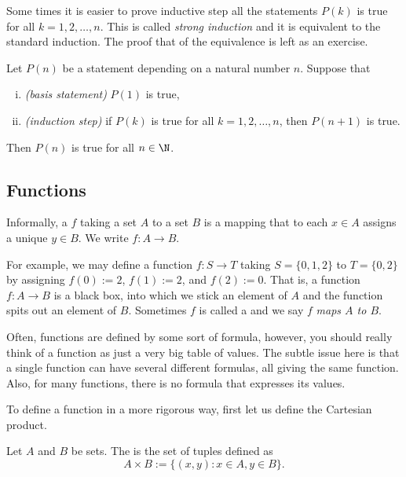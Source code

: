 \documentclass[12pt]{book}
\begin{document}
Some times it is easier to prove inductive step all the statements $P(k)$ is true for all $k = 1,2,\ldots,n$.
This is called \emph{strong induction} and it is equivalent to the standard induction.  
The proof that of the equivalence is left as an exercise.

\begin{thm}
Let $P(n)$ be a statement depending on a natural number $n$.  Suppose that
\begin{enumerate}[(i)]
\item \emph{(basis statement)} $P(1)$ is true,
\item \emph{(induction step)} if $P(k)$ is true for all $k = 1,2,\ldots,n$, then $P(n+1)$ is true.
\end{enumerate}
Then $P(n)$ is true for all $n \in \N$.
\end{thm}

\subsection*{Functions}

Informally,
a \emph{}
$f$ taking a set $A$ to a set $B$
is a mapping that to each $x \in A$ assigns a unique $y \in B$.
We write
$f \colon A \to B$.  

For example, we may define a function $f \colon S \to T$ taking $S = \{ 0, 1, 2 \}$ to $T = \{ 0, 2 \}$
by assigning $f(0) := 2$, $f(1) := 2$, and $f(2) := 0$.  
That is, a function $f
\colon A \to B$ is
a black box, into which we stick an element of $A$ and the function
spits out an element of $B$.
Sometimes $f$ is called a \emph{}
and we say $f$ \emph{maps $A$ to $B$}.


Often, functions are defined by some sort of
formula, however, you should really think of a function as just a very big
table of values.
The subtle issue here is that a single function can have several different
formulas, all giving the same function.
Also, for many functions, there is
no formula that expresses its values.

To define a function in a more rigorous way, first let us define the Cartesian product.

\begin{defn}
Let $A$ and $B$ be sets.
The \emph{}
is the set of tuples defined as
\begin{equation*}
A \times B :=
\{ (x,y) : x \in A, y \in B \} .
\end{equation*}
\end{defn}
\end{document}
